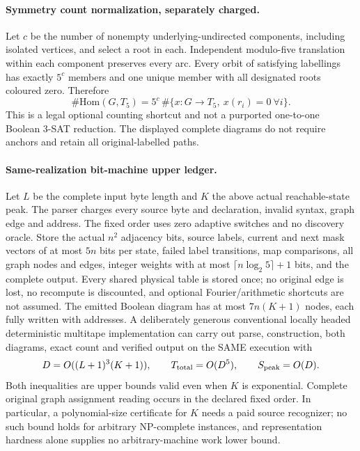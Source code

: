\documentclass[11pt]{article}
\begin{document}
\paragraph{Symmetry count normalization, separately charged.}
Let $c$ be the number of nonempty underlying-undirected components,
including isolated vertices, and select a root in each. Independent
modulo-five translation within each component preserves every arc.
Every orbit of satisfying labellings has exactly $5^c$ members and
one unique member with all designated roots coloured zero. Therefore
\[
 \#\mathrm{Hom}(G,T_5)
 =5^c\,\#\{x:G\to T_5,\ x(r_i)=0\ \forall i\}.
\]
This is a legal optional counting shortcut and not a purported
one-to-one Boolean 3-SAT reduction. The displayed complete diagrams
do not require anchors and retain all original-labelled paths.

\paragraph{Same-realization bit-machine upper ledger.}
Let $L$ be the complete input byte length and $K$ the above actual
reachable-state peak. The parser charges every source byte and
declaration, invalid syntax, graph edge and address. The fixed order
uses zero adaptive switches and no discovery oracle. Store the actual
$n^2$ adjacency bits, source labels, current and next mask vectors of
at most $5n$ bits per state, failed label transitions, map comparisons,
all graph nodes and edges, integer weights with at most
$\lceil n\log_2 5\rceil+1$ bits, and the complete output. Every shared
physical table is stored once; no original edge is lost, no recompute
is discounted, and optional Fourier/arithmetic shortcuts are not
assumed. The emitted Boolean diagram has at most $7n(K+1)$ nodes,
each fully written with addresses. A deliberately generous
conventional locally headed deterministic multitape implementation
can carry out parse, construction, both diagrams, exact count and
verified output on the SAME execution with
\[
 D=O((L+1)^3(K+1)),\qquad
 T_{\rm total}=O(D^5),\qquad S_{\rm peak}=O(D).
\]
Both inequalities are upper bounds valid even when $K$ is
exponential. Complete original graph assignment reading occurs in
the declared fixed order. In particular, a polynomial-size
certificate for $K$ needs a paid source recognizer; no such bound
holds for arbitrary NP-complete instances, and representation
hardness alone supplies no arbitrary-machine work lower bound.
\end{document}
